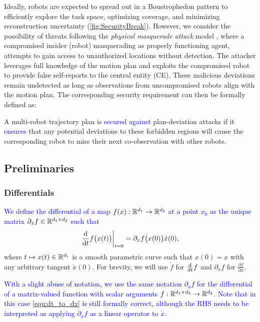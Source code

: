 \documentclass[10pt,twocolumn,twoside]{IEEEtran}
\newcommand{\new}[1]{\textcolor{blue}{#1}}
\newcommand{\news}{\color{blue}}
\begin{document}
{\news Ideally, robots are expected to spread out in a Boustrophedon pattern to efficiently explore the task space, optimizing coverage, and minimizing reconstruction uncertainty (\cref{fig:SecurityBreak}). However, we consider the possibility of threats following the \emph{physical masquerade attack} model \cite{wardega2019resilience}, where a compromised insider (robot) masquerading as properly functioning agent, attempts to gain access to unauthorized locations without detection. The attacker leverages full knowledge of the motion plan and exploits the compromised robot to provide false self-reports to the central entity (CE). These malicious deviations remain undetected as long as observations from uncompromised robots align with the motion plan. The corresponding security requirement can then be formally defined as:}
\begin{definition}\label{def:secured-plan}
  A multi-robot trajectory plan is \new{secured against} plan-deviation attacks if it \new{ensures} that any potential deviations to these forbidden regions will cause the corresponding robot to miss their next co-observation with other robots. 
\end{definition}

\subsection{Preliminaries}
\subsubsection{Differentials}
\new{We define the differential of a map $f(x):\mathbb{R}^{d_1}{}\to\mathbb{R}^{d_2}{}$ at a point $x_0$ as the unique matrix $\partial_x f \in\mathbb{R}^{d_1\times d_2}{}$ such that}
\begin{equation}\label{equ:dt_to_dx}
  \left.\frac{\mathrm{d} }{\mathrm{d} t} f\bigl(x(t)\bigr)\right|_{t=0}=\partial_x f\bigl(x(0)\bigr) \dot{x}(0),
\end{equation}
where $t\mapsto x(t)\in\mathbb{R}^{d_1}{}$ is a smooth parametric curve such that $x(0)=x$ with any arbitrary tangent $\dot{x}(0)$. For brevity, we will use $\dot f$ for $\frac{\mathrm{d} }{\mathrm{d} t} f$ and $\partial_x f$ for $\frac{\partial f}{\partial x}$. 

\new{With a slight abuse of notation, we use the same notation $\partial_xf$ for the differential of a matrix-valued function with scalar arguments $f:\mathbb{R}^{d_1 \times d_3}{}\to\mathbb{R}^{d_2}{}$.  Note that in this case \eqref{equ:dt_to_dx} is still formally correct, although the RHS needs to be interpreted as applying $\partial_x f$ as a linear operator to $\dot{x}$.}
\end{document}
